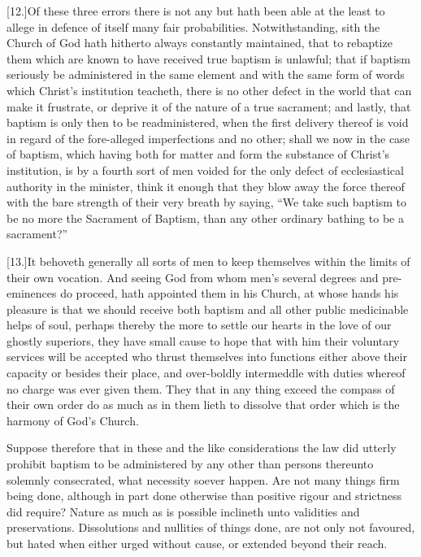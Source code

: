 [12.]Of these three errors there is not any but hath been  able at the least to allege in defence of itself many fair probabilities.
 Notwithstanding, sith the Church of God hath hitherto always constantly maintained, that to rebaptize them which are known to have received true baptism is unlawful; that if baptism seriously be administered in the same element and with the same form of words which Christ’s institution teacheth, there is no other defect in the world that can make it frustrate, or deprive it of the nature of a true sacrament; and lastly, that baptism is only then to be readministered, when the first delivery thereof is void in regard of the fore-alleged imperfections and no other; shall we now in the case of baptism, which having both for matter and form the substance of Christ’s institution, is by a fourth sort of men voided for the only defect of ecclesiastical authority in the minister, think it enough that they blow away the force thereof with the bare strength of their very breath by saying, “We take such baptism to be no more the Sacrament of Baptism, than any other ordinary bathing to be a sacrament?”

[13.]It behoveth generally all sorts of men to keep themselves within the limits of their own vocation. And seeing God from whom men’s several degrees and pre-eminences do proceed, hath appointed them in his Church, at whose hands his pleasure is that we should receive both baptism and all other public medicinable helps of soul, perhaps thereby the more to settle our hearts in the love of our ghostly superiors, they have small cause to hope that with him their voluntary services will be accepted who thrust themselves into functions either above their capacity or besides their place, and over-boldly intermeddle with duties whereof no charge was ever given them. They that in any thing exceed the compass of their own order do as much as in them lieth to dissolve that order which is the harmony of God’s Church.

Suppose therefore that in these and the like considerations the law did utterly prohibit baptism to be administered by any other than persons thereunto solemnly consecrated, what necessity soever happen. Are not many things firm being  done, although in part done otherwise than positive rigour and strictness did require? Nature as much as is possible inclineth unto validities and preservations. Dissolutions and nullities of things done, are not only not favoured, but hated when either urged without cause, or extended beyond their reach.

